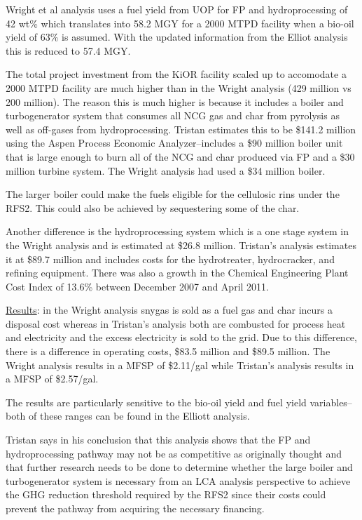 \documentclass{article}\usepackage[]{graphicx}\usepackage[]{color}
\begin{document}
Wright et al analysis uses a fuel yield from UOP for FP and hydroprocessing of 42 wt\% which translates into 58.2 MGY for a 2000 MTPD facility when a bio-oil yield of 63\% is assumed.  With the updated information from the Elliot analysis this is reduced to 57.4 MGY.

The total project investment from the KiOR facility scaled up to accomodate a 2000 MTPD facility are much higher than in the Wright analysis (429 million vs 200 million).  The reason this is much higher is because it includes a boiler and turbogenerator system that consumes all NCG gas and char from pyrolysis as well as off-gases from hydroprocessing.  Tristan estimates this to be \$141.2 million using the Aspen Process Economic Analyzer--includes a \$90 million boiler unit that is large enough to burn all of the NCG and char produced via FP and a \$30 million turbine system.  The Wright analysis had used a \$34 million boiler.  

The larger boiler could make the fuels eligible for the cellulosic rins under the RFS2.  This could also be achieved by sequestering some of the char.

Another difference is the hydroprocessing system which is a one stage system in the Wright analysis and is estimated at \$26.8 million.  Tristan's analysis estimates it at \$89.7 million and includes costs for the hydrotreater, hydrocracker, and refining equipment.  There was also a growth in the Chemical Engineering Plant Cost Index of 13.6\% between December 2007 and April 2011.

\underline{Results}: in the Wright analysis snygas is sold as a fuel gas and char incurs a disposal cost whereas in Tristan's analysis both are combusted for process heat and electricity and the excess electricity is sold to the grid.  Due to this difference, there is a difference in operating costs, \$83.5 million and \$89.5 million.  The Wright analysis results in a MFSP of \$2.11/gal while Tristan's analysis results in a MFSP of \$2.57/gal.

The results are particularly sensitive to the bio-oil yield and fuel yield variables--both of these ranges can be found in the Elliott analysis.  

Tristan says in his conclusion that this analysis shows that the FP and hydroprocessing pathway may not be as competitive as originally thought and that further research needs to be done to determine whether the large boiler and turbogenerator system is necessary from an LCA analysis perspective to achieve the GHG reduction threshold required by the RFS2 since their costs could prevent the pathway from acquiring the necessary financing.
\end{document}
